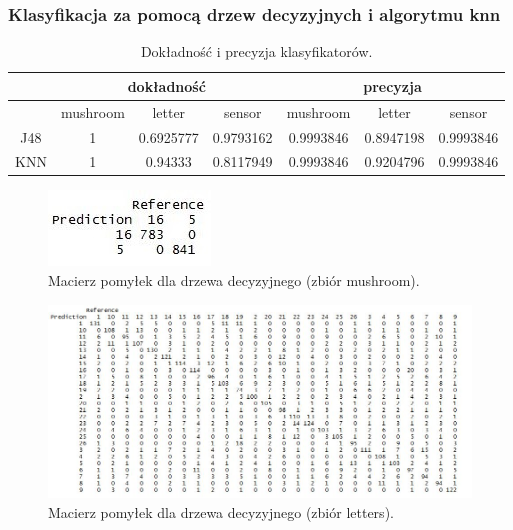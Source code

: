 \documentclass[11pt,a4paper,twoside]{article}
\begin{document}

\subsubsection{Klasyfikacja za pomocą drzew decyzyjnych i algorytmu knn}

\begin{table}[ht]
\centering
\caption{Dokładność i precyzja klasyfikatorów.}
\label{accPrec_klasyfikacja}
\begin{tabular}{|*{7}{c|}}
\hline
 & \multicolumn{3}{c|}{dokładność} & \multicolumn{3}{c|}{precyzja} \\\hline
 & mushroom & letter & sensor & mushroom & letter & sensor \\\hline
J48   &   1      &   0.6925777   &    0.9793162    &    0.9993846    &   0.8947198    &   0.9993846   \\\hline
 KNN &   1      &    0.94333      &   0.8117949     &    0.9993846    &   0.9204796    &   0.9993846   \\\hline
\end{tabular}
\end{table}

\begin{figure}[ht]
\centering
\includegraphics[scale=0.8]{confMatrixJ48_mushroom.JPG}
\caption{Macierz pomyłek dla drzewa decyzyjnego (zbiór mushroom).}
\label{confMatrixJ48_mushroom}
\end{figure}

\begin{figure}[H]
\centering
\includegraphics[scale=0.6]{confMatrixJ48_letters.JPG}
\caption{Macierz pomyłek dla drzewa decyzyjnego (zbiór letters).}
\label{confMatrixJ48_letters}
\end{figure}
\end{document}
